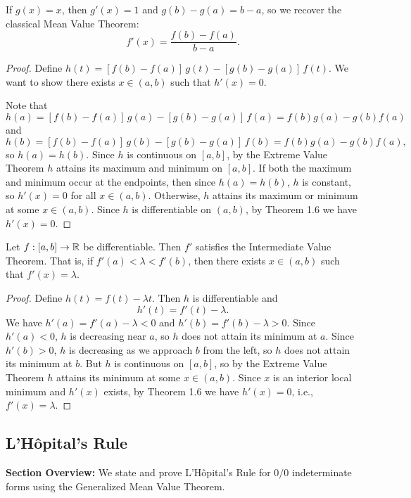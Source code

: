 \documentclass[../master/master.tex]{subfiles}
\begin{document}
\begin{remark}
If $g(x) = x$, then $g'(x) = 1$ and $g(b) - g(a) = b - a$, so we recover the classical Mean Value Theorem:
\[
f'(x) = \frac{f(b) - f(a)}{b - a}.
\]
\end{remark}

\begin{proof}
Define $h(t) = [f(b) - f(a)]\, g(t) - [g(b) - g(a)]\, f(t)$. We want to show there exists $x \in (a,b)$ such that $h'(x) = 0$.

Note that
\[
h(a) = [f(b) - f(a)]\, g(a) - [g(b) - g(a)]\, f(a) = f(b)g(a) - g(b)f(a)
\]
and
\[
h(b) = [f(b) - f(a)]\, g(b) - [g(b) - g(a)]\, f(b) = f(b)g(a) - g(b)f(a),
\]
so $h(a) = h(b)$. Since $h$ is continuous on $[a,b]$, by the Extreme Value Theorem $h$ attains its maximum and minimum on $[a,b]$. If both the maximum and minimum occur at the endpoints, then since $h(a) = h(b)$, $h$ is constant, so $h'(x) = 0$ for all $x \in (a,b)$. Otherwise, $h$ attains its maximum or minimum at some $x \in (a,b)$. Since $h$ is differentiable on $(a,b)$, by Theorem 1.6 we have $h'(x) = 0$.
\end{proof}

\begin{theorem}
Let $f: [a,b] \to \mathbb{R}$ be differentiable. Then $f'$ satisfies the Intermediate Value Theorem. That is, if $f'(a) < \lambda < f'(b)$, then there exists $x \in (a,b)$ such that $f'(x) = \lambda$.
\end{theorem}

\begin{proof}
Define $h(t) = f(t) - \lambda t$. Then $h$ is differentiable and
\[
h'(t) = f'(t) - \lambda.
\]
We have $h'(a) = f'(a) - \lambda < 0$ and $h'(b) = f'(b) - \lambda > 0$. Since $h'(a) < 0$, $h$ is decreasing near $a$, so $h$ does not attain its minimum at $a$. Since $h'(b) > 0$, $h$ is decreasing as we approach $b$ from the left, so $h$ does not attain its minimum at $b$. But $h$ is continuous on $[a,b]$, so by the Extreme Value Theorem $h$ attains its minimum at some $x \in (a,b)$. Since $x$ is an interior local minimum and $h'(x)$ exists, by Theorem 1.6 we have $h'(x) = 0$, i.e., $f'(x) = \lambda$.
\end{proof}

\subsection{L'H\^opital's Rule}

\begin{summarybox}
\textbf{Section Overview:} We state and prove L'H\^opital's Rule for $0/0$ indeterminate forms using the Generalized Mean Value Theorem.
\end{summarybox}
\end{document}
